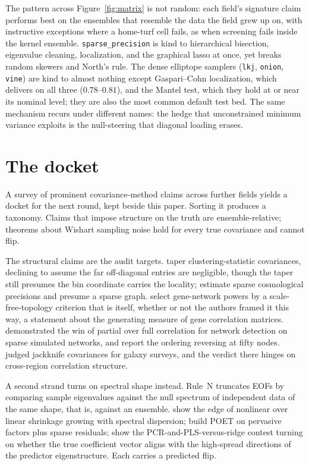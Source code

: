 \documentclass[11pt]{article}
\begin{document}
The pattern across Figure~\ref{fig:matrix} is not random: each field's
signature claim performs best on the ensembles that resemble the data the
field grew up on, with instructive exceptions where a home-turf cell
fails, as when screening fails inside the kernel ensemble.
\texttt{sparse\_precision} is kind to hierarchical bisection, eigenvalue
cleaning, localization, and the graphical lasso at once, yet breaks
random skewers and North's rule. The dense elliptope samplers
(\texttt{lkj}, \texttt{onion}, \texttt{vine}) are kind to almost nothing
except Gaspari--Cohn localization, which delivers on all three
($0.78$--$0.81$), and the Mantel test, which they hold at or near its
nominal level; they are also the most common default test bed.
The same mechanism recurs under different names: the hedge that
unconstrained minimum variance exploits is the null-steering that
diagonal loading erases.

\section{The docket}

A survey of prominent covariance-method claims across further fields
yields a docket for the next round, kept beside this paper. Sorting it
produces a taxonomy. Claims that impose structure on the truth are
ensemble-relative; theorems about Wishart sampling noise hold for every
true covariance and cannot flip.

The structural claims are the audit targets. \citet{paz2015} taper clustering-statistic covariances, declining to
assume the far off-diagonal entries are negligible, though the taper still
presumes the bin coordinate carries the locality;
\citet{padmanabhan2016} estimate sparse cosmological precisions and
presume a sparse graph. \citet{zhang2005} select gene-network
powers by a scale-free-topology criterion that is itself, whether or not the authors framed it this way,
a statement about the generating measure of gene correlation matrices. \citet{smith2011} demonstrated the win of partial over full correlation for network
detection on sparse simulated networks, and report the ordering reversing at
fifty nodes. \citet{norberg2009} judged
jackknife covariances for galaxy surveys, and the verdict there hinges on
cross-region correlation structure.

A second strand turns on spectral shape instead. Rule~N \citep{preisendorfer1988}
truncates EOFs by comparing sample eigenvalues against the null spectrum of
independent data of the same shape, that is, against an ensemble. \citet{ledoit2012} show the edge of nonlinear over linear shrinkage growing
with spectral dispersion; \citet{fan2013} build POET on pervasive
factors plus sparse residuals; \citet{frank1993} show the
PCR-and-PLS-versus-ridge contest turning on whether the true coefficient
vector aligns with the high-spread directions of the predictor
eigenstructure. Each carries a predicted flip.
\end{document}
